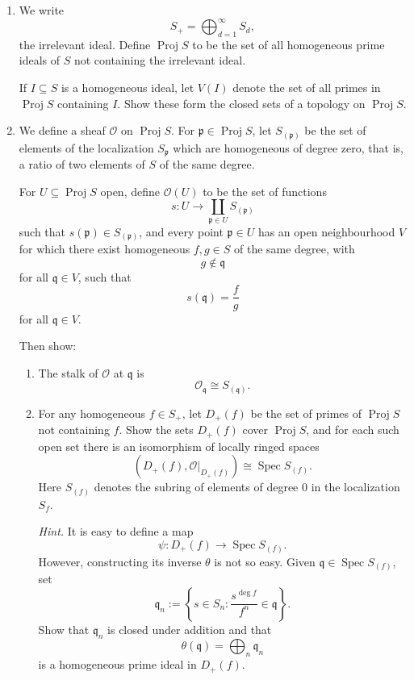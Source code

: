 \begin{enumerate}
	\item[(i)]
	We write
	\[
	S_+ = \bigoplus_{d=1}^{\infty} S_d,
	\]
	the irrelevant ideal. Define \(\operatorname{Proj} S\) to be the set of all homogeneous prime ideals
	of \(S\) not containing the irrelevant ideal.
	
	If \(I\subseteq S\) is a homogeneous ideal, let \(V(I)\) denote the set of all primes
	in \(\operatorname{Proj} S\) containing \(I\). Show these form the closed sets of a topology on
	\(\operatorname{Proj} S\).
	
	\item[(ii)]
	We define a sheaf \(\mathcal O\) on \(\operatorname{Proj} S\). For \(\mathfrak p\in \operatorname{Proj} S\), let
	\(S_{(\mathfrak p)}\) be the set of elements of the localization \(S_{\mathfrak p}\)
	which are homogeneous of degree zero, that is, a ratio of two elements of \(S\) of
	the same degree.
	
	For \(U\subseteq \operatorname{Proj} S\) open, define \(\mathcal O(U)\) to be the set of functions
	\[
	s:U\longrightarrow \coprod_{\mathfrak p\in U} S_{(\mathfrak p)}
	\]
	such that \(s(\mathfrak p)\in S_{(\mathfrak p)}\), and every point
	\(\mathfrak p\in U\) has an open neighbourhood \(V\) for which there exist
	homogeneous \(f,g\in S\) of the same degree, with
	\[
	g\notin \mathfrak q
	\]
	for all \(\mathfrak q\in V\), such that
	\[
	s(\mathfrak q)=\frac{f}{g}
	\]
	for all \(\mathfrak q\in V\).
	
	Then show:
	
	\begin{enumerate}
		\item[(a)]
		The stalk of \(\mathcal O\) at \(\mathfrak q\) is
		\[
		\mathcal O_{\mathfrak q}\cong S_{(\mathfrak q)}.
		\]
		
		\item[(b)]
		For any homogeneous \(f\in S_+\), let \(D_+(f)\) be the set of primes of
		\(\operatorname{Proj} S\) not containing \(f\). Show the sets \(D_+(f)\) cover \(\operatorname{Proj} S\),
		and for each such open set there is an isomorphism of locally ringed spaces
		\[
		\left(D_+(f),\mathcal O|_{D_+(f)}\right)
		\cong
		\operatorname{Spec} S_{(f)}.
		\]
		Here \(S_{(f)}\) denotes the subring of elements of degree \(0\) in the localization
		\(S_f\).
		
		\emph{Hint.} It is easy to define a map
		\[
		\psi:D_+(f)\longrightarrow \operatorname{Spec} S_{(f)}.
		\]
		However, constructing its inverse \(\theta\) is not so easy. Given
		\(\mathfrak q\in \operatorname{Spec} S_{(f)}\), set
		\[
		\mathfrak q_n
		:=
		\left\{
		s\in S_n :
		\frac{s^{\deg f}}{f^n}\in \mathfrak q
		\right\}.
		\]
		Show that \(\mathfrak q_n\) is closed under addition and that
		\[
		\theta(\mathfrak q)
		=
		\bigoplus_n \mathfrak q_n
		\]
		is a homogeneous prime ideal in \(D_+(f)\).
		

\end{enumerate}
\end{enumerate}
